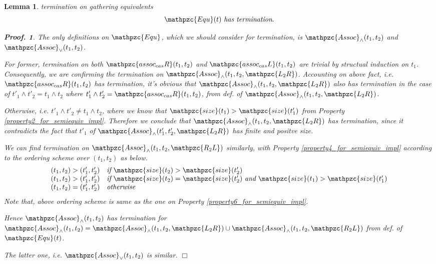 \documentclass[12pt]{article}
\newtheorem{Lemma}{Lemma}[section]
\newtheorem{Proof}{Proof.}
\begin{document}
\begin{Lemma}{termination on gathering equivalents}
  \[ \mathpzc{Equ}(t)\ \text{\it has termination}.
  \]
  \begin{Proof}
    The only definitions on $\mathpzc{Equ}$, which we should consider
    for termination, is $\mathpzc{Assoc}_\wedge(t_1, t_2)$ and
    $\mathpzc{Assoc}_\vee(t_1, t_2)$.
    
    For former, termination on both $\mathpzc{assoc_{cas}R}(t_1, t_2)$ and
    $\mathpzc{assoc_{cas}L}(t_1, t_2)$ are trivial by structual induction
    on $t_1$.
    Consequently, we are confirming the termination on
    $\mathpzc{Assoc}_\wedge(t_1, t_2, \mathpzc{L_2R})$.
    Accounting on above fact, i.e. $\mathpzc{assoc_{cas}R}(t_1, t_2)$
    has termination, it's obvious that
    $\mathpzc{Assoc}_\wedge(t_1, t_2, \mathpzc{L_2R})$ also has termination
    in the case of $t'_1 \wedge t'_2 = t_1 \wedge t_2$ where
    $t'_1 \wedge t'_2 = \mathpzc{assoc_{cas}R}(t_1, t_2)$, from
    def. of $\mathpzc{Assoc}_\wedge(t_1, t_2, \mathpzc{L_2R})$.
    
    Otherwise, i.e. $t'_1 \wedge t'_2 \neq t_1 \wedge t_2$, where we know
    that $\mathpzc{size}(t_1) > \mathpzc{size}(t'_1)$ from Property
    \ref{property2_for_semiequiv_impl}. Therefore we conclude that
    $\mathpzc{Assoc}_\wedge(t_1, t_2, \mathpzc{L_2R})$ has
    termination, since it contradicts the fact that
    $t'_1$ of $\mathpzc{Assoc}_\wedge(t'_1, t'_2, \mathpzc{L_2R})$ has
    finite and positve size.

    We can find termination on
    $\mathpzc{Assoc}_\wedge(t_1, t_2, \mathpzc{R_2L})$ similarly, with
    Property \ref{property4_for_semiequiv_impl} according to the
    ordering scheme over $(t_1, t_2)$ as below.
    \[ \begin{array}{l}
      (t_1, t_2) > (t'_1, t'_2) \quad
       \text{\it if}\ \mathpzc{size}(t_2) > \mathpzc{size}(t'_2)  \\
      (t_1, t_2) > (t'_1, t'_2) \quad
       \text{\it if}\ \mathpzc{size}(t_2) = \mathpzc{size}(t'_2)\
        \text{\it and}\ \mathpzc{size}(t_1) > \mathpzc{size}(t'_1)  \\
      (t_1, t_2) = (t'_1, t'_2) \quad \text{\it otherwise}
    \end{array}
    \]
    Note that, above ordering scheme is same as the one on Property
    \ref{property6_for_semiequiv_impl}.
    
    Hence $\mathpzc{Assoc}_\wedge(t_1, t_2)$ has termination for
    $\mathpzc{Assoc}_\wedge(t_1, t_2) =
    \mathpzc{Assoc}_\wedge(t_1, t_2, \mathpzc{L_2R}) \cup
    \mathpzc{Assoc}_\wedge(t_1, t_2, \mathpzc{R_2L})$ from def. of
    $\mathpzc{Equ}(t)$.
    
    The latter one, i.e. $\mathpzc{Assoc}_\vee(t_1, t_2)$ is similar.
    $\Box$
  \end{Proof}
\end{Lemma}
\end{document}
